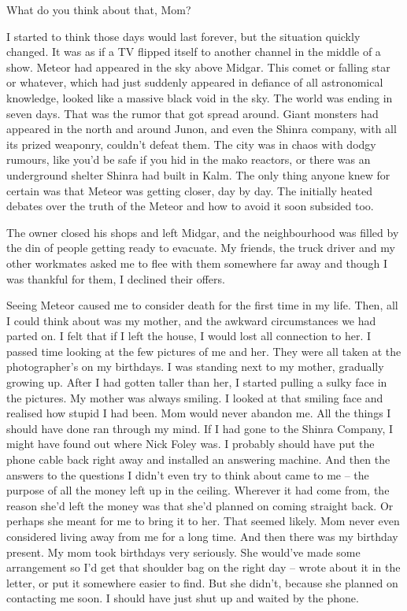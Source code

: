 \documentclass[oneside]{book}
\begin{document}
What do you think about that, Mom?

I started to think those days would last forever, but the situation quickly changed. It was as if a TV flipped itself to another channel in the middle of a show. Meteor had appeared in the sky above Midgar. This comet or falling star or whatever, which had just suddenly appeared in defiance of all astronomical knowledge, looked like a massive black void in the sky. The world was ending in seven days. That was the rumor that got spread around. Giant monsters had appeared in the north and around Junon, and even the Shinra company, with all its prized weaponry, couldn’t defeat them. The city was in chaos with dodgy rumours, like you’d be safe if you hid in the mako reactors, or there was an underground shelter Shinra had built in Kalm. The only thing anyone knew for certain was that Meteor was getting closer, day by day. The initially heated debates over the truth of the Meteor and how to avoid it soon subsided too.

The owner closed his shops and left Midgar, and the neighbourhood was filled by the din of people getting ready to evacuate. My friends, the truck driver and my other workmates asked me to flee with them somewhere far away and though I was thankful for them, I declined their offers.

Seeing Meteor caused me to consider death for the first time in my life. Then, all I could think about was my mother, and the awkward circumstances we had parted on. I felt that if I left the house, I would lost all connection to her. I passed time looking at the few pictures of me and her. They were all taken at the photographer’s on my birthdays. I was standing next to my mother, gradually growing up. After I had gotten taller than her, I started pulling a sulky face in the pictures. My mother was always smiling. I looked at that smiling face and realised how stupid I had been. Mom would never abandon me. All the things I should have done ran through my mind. If I had gone to the Shinra Company, I might have found out where Nick Foley was. I probably should have put the phone cable back right away and installed an answering machine. And then the answers to the questions I didn’t even try to think about came to me – the purpose of all the money left up in the ceiling. Wherever it had come from, the reason she’d left the money was that she’d planned on coming straight back. Or perhaps she meant for me to bring it to her. That seemed likely. Mom never even considered living away from me for a long time. And then there was my birthday present. My mom took birthdays very seriously. She would’ve made some arrangement so I’d get that shoulder bag on the right day – wrote about it in the letter, or put it somewhere easier to find. But she didn’t, because she planned on contacting me soon. I should have just shut up and waited by the phone.
\end{document}
